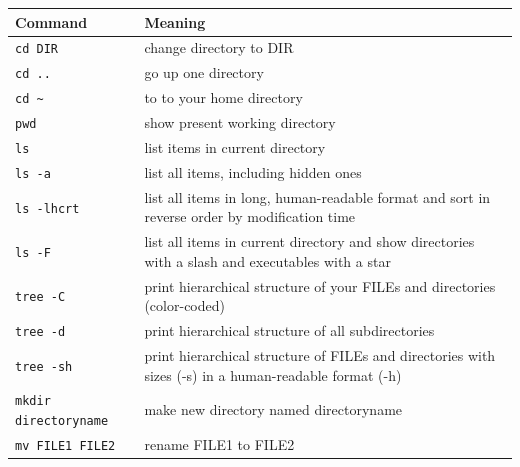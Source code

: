 \documentclass[11pt]{article}
\begin{document}
\begin{center}
\begin{tabular}{ll}
 Command                        &  Meaning                                                                                                \\
\hline
 \texttt{cd DIR}                &  change directory to DIR                                                                                \\
\hline
 \texttt{cd ..}                 &  go up one directory                                                                                    \\
\hline
 \texttt{cd \textasciitilde{}}  &  to to your home directory                                                                              \\
\hline
 \texttt{pwd}                   &  show present working directory                                                                         \\
\hline
 \texttt{ls}                    &  list items in current directory                                                                        \\
\hline
 \texttt{ls -a}                 &  list all items, including hidden ones                                                                  \\
\hline
 \texttt{ls -lhcrt}             &  list all items in long, human-readable format and sort in reverse order by modification time           \\
\hline
 \texttt{ls -F}                 &  list all items in current directory and show directories with a slash and executables with a star      \\
\hline
 \texttt{tree  -C}              &  print hierarchical structure of your FILEs and directories (color-coded)                               \\
\hline
 \texttt{tree -d}               &  print hierarchical structure of all subdirectories                                                     \\
\hline
 \texttt{tree -sh}              &  print hierarchical structure of FILEs and directories with sizes (-s) in a human-readable format (-h)  \\
\hline
 \texttt{mkdir directoryname}   &  make new directory named directoryname                                                                 \\
\hline
 \texttt{mv FILE1 FILE2}        &  rename FILE1 to FILE2                                                                                  \\

\end{tabular}
\end{center}
\end{document}
